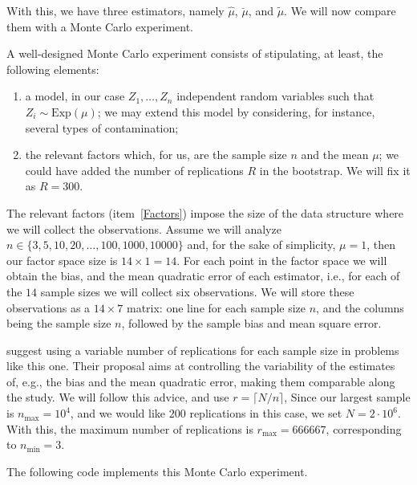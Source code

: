 With this, we have three estimators, namely $\widehat{\mu}$, $\breve{\mu}$, and $\widetilde{\mu}$.
We will now compare them with a Monte Carlo experiment.

A well-designed Monte Carlo experiment consists of stipulating, at least, the following elements:
\begin{enumerate}
\item a model, in our case $Z_1,\dots,Z_n$ independent random variables such that $Z_i\sim \text{Exp}(\mu)$; we may extend this model by considering, for instance, several types of contamination;
\item\label{Factors} the relevant factors which, for us, are the sample size $n$ and the mean $\mu$; we could have added the number of replications $R$ in the bootstrap. 
We will fix it as $R=300$.
\end{enumerate}

The relevant factors (item~\ref{Factors}) impose the size of the data structure where we will collect the observations.
Assume we will analyze $n\in\{3,5,10,20,\dots,100,1000,10000\}$ and, for the sake of simplicity, $\mu=1$, then our factor space size is $14\times1=14$.
For each point in the factor space we will obtain the bias, and the mean quadratic error of each estimator, i.e., for each of the $14$ sample sizes we will collect six observations.
We will store these observations as a $14\times 7$ matrix: one line for each sample size $n$, and the columns being the sample size $n$, followed by the sample bias and mean square error.

\citet{busto92} suggest using a variable number of replications for each sample size in problems like this one.
Their proposal aims at controlling the variability of the estimates of, e.g., the bias and the mean quadratic error, making them comparable along the study.
We will follow this advice, and use $r=\lceil N/n\rceil$, 
Since our largest sample is $n_{\max}=10^4$, and we would like $200$ replications in this case, we set $N=2\cdot 10^6$.
With this, the maximum number of replications is $r_{\max}=666667$, corresponding to $n_{\min}=3$.

The following code implements this Monte Carlo experiment.


